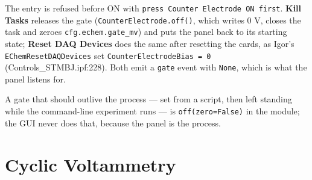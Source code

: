 The entry is refused before ON with \texttt{press Counter Electrode ON first}. \textbf{Kill Tasks} releases the gate (\texttt{Counter\discretionary{}{}{}Electrode.\discretionary{}{}{}off()}, which writes 0 V, closes the task and zeroes \texttt{cfg.\discretionary{}{}{}echem.\discretionary{}{}{}gate\_\discretionary{}{}{}mv}) and puts the panel back to its starting state; \textbf{Reset DAQ Devices} does the same after resetting the cards, as Igor's \texttt{EChem\discretionary{}{}{}Reset\discretionary{}{}{}DAQDevices} set \texttt{Counter\discretionary{}{}{}Electrode\discretionary{}{}{}Bias = 0} (Controls\_STMBJ.ipf:228). Both emit a \texttt{gate} event with \texttt{None}, which is what the panel listens for.

A gate that should outlive the process --- set from a script, then left standing while the command-line experiment runs --- is \texttt{off(zero=False)} in the module; the GUI never does that, because the panel is the process.

\section{Cyclic Voltammetry}

